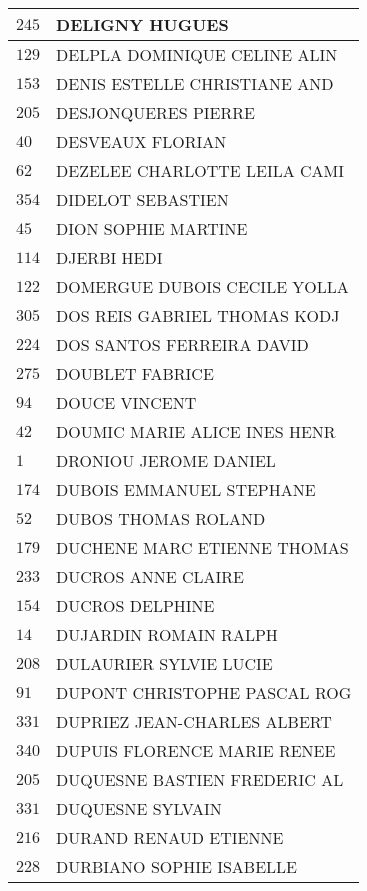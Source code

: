 \begin{xltabular}{\linewidth}{|l|X|}
    \hline
    $245$ & DELIGNY HUGUES \\
    \hline
    $129$ & DELPLA DOMINIQUE CELINE ALIN \\
    \hline
    $153$ & DENIS ESTELLE CHRISTIANE AND \\
    \hline
    $205$ & DESJONQUERES PIERRE \\
    \hline
    $40$ & DESVEAUX FLORIAN \\
    \hline
    $62$ & DEZELEE CHARLOTTE LEILA CAMI \\
    \hline
    $354$ & DIDELOT SEBASTIEN \\
    \hline
    $45$ & DION SOPHIE MARTINE \\
    \hline
    $114$ & DJERBI HEDI \\
    \hline
    $122$ & DOMERGUE DUBOIS CECILE YOLLA \\
    \hline
    $305$ & DOS REIS GABRIEL THOMAS KODJ \\
    \hline
    $224$ & DOS SANTOS FERREIRA DAVID \\
    \hline
    $275$ & DOUBLET FABRICE \\
    \hline
    $94$ & DOUCE VINCENT \\
    \hline
    $42$ & DOUMIC MARIE ALICE INES HENR \\
    \hline
    $1$ & DRONIOU JEROME DANIEL \\
    \hline
    $174$ & DUBOIS EMMANUEL STEPHANE \\
    \hline
    $52$ & DUBOS THOMAS ROLAND \\
    \hline
    $179$ & DUCHENE MARC ETIENNE THOMAS \\
    \hline
    $233$ & DUCROS ANNE CLAIRE \\
    \hline
    $154$ & DUCROS DELPHINE \\
    \hline
    $14$ & DUJARDIN ROMAIN RALPH \\
    \hline
    $208$ & DULAURIER SYLVIE LUCIE \\
    \hline
    $91$ & DUPONT CHRISTOPHE PASCAL ROG \\
    \hline
    $331$ & DUPRIEZ JEAN-CHARLES ALBERT \\
    \hline
    $340$ & DUPUIS FLORENCE MARIE RENEE \\
    \hline
    $205$ & DUQUESNE BASTIEN FREDERIC AL \\
    \hline
    $331$ & DUQUESNE SYLVAIN \\
    \hline
    $216$ & DURAND RENAUD ETIENNE \\
    \hline
    $228$ & DURBIANO SOPHIE ISABELLE \\

\end{xltabular}
